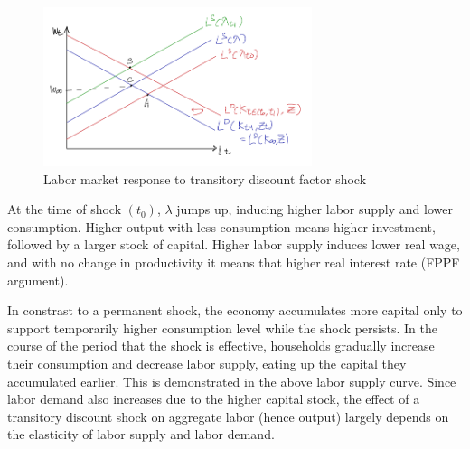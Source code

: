 \documentclass[11pt]{amsart}
\begin{document}
\begin{figure}[H]
	\centering
	\includegraphics[width=0.7\textwidth]{2_3_Minki.png}
	\caption{Labor market response to transitory discount factor shock}
\end{figure}
At the time of shock $(t_0)$, $\lambda$ jumps up, inducing higher labor supply and lower consumption. Higher output with less consumption means higher investment, followed by a larger stock of capital. Higher labor supply induces lower real wage, and with no change in productivity it means that higher real interest rate (FPPF argument). 

In constrast to a permanent shock, the economy accumulates more capital only to support temporarily higher consumption level while the shock persists. In the course of the period that the shock is effective, households gradually increase their consumption and decrease labor supply, eating up the capital they accumulated earlier. This is demonstrated in the above labor supply curve. Since labor demand also increases due to the higher capital stock, the effect of a transitory discount shock on aggregate labor (hence output) largely depends on the elasticity of labor supply and labor demand.  
\end{document}

